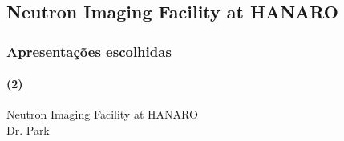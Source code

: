 \documentclass[svgnames,smaller,table]{beamer}
\begin{document}
\begin{frame}
  
\end{frame}

\begin{frame}
    
\end{frame}

\begin{frame}
  
\end{frame}

\begin{frame}
  
\end{frame}

\begin{frame}
  
\end{frame}

\begin{frame}
  
\end{frame}

\begin{frame}
  
\end{frame}

\begin{frame}
  
\end{frame}

\subsection{Neutron Imaging Facility at HANARO}
\begin{frame}
  \frametitle{Apresentações escolhidas}
  \framesubtitle{(2)}
  \begin{center}
    Neutron Imaging Facility at HANARO\\
    \vspace{2.0cm}
    Dr. Park
  \end{center}
\end{frame}


\begin{frame}
  
\end{frame}

\begin{frame}
  
\end{frame}
\end{document}
